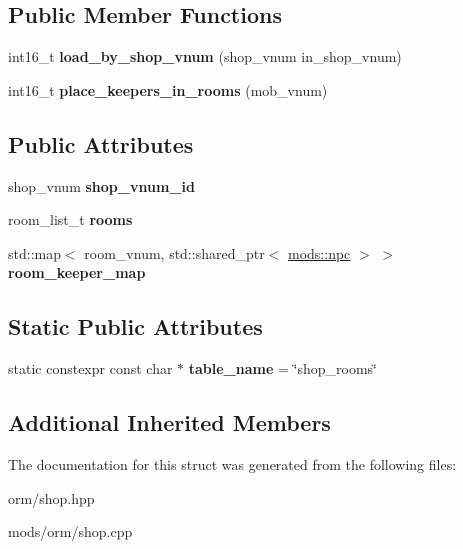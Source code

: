 \subsection*{Public Member Functions}
\begin{DoxyCompactItemize}
\item 
\mbox{\label{structmods_1_1orm_1_1shop__rooms_a9facf0b45b67f151123ca490018e53a3}} 
int16\+\_\+t {\bfseries load\+\_\+by\+\_\+shop\+\_\+vnum} (shop\+\_\+vnum in\+\_\+shop\+\_\+vnum)
\item 
\mbox{\label{structmods_1_1orm_1_1shop__rooms_aaf9b2135573447f06f3a43a8ae4ec7d4}} 
int16\+\_\+t {\bfseries place\+\_\+keepers\+\_\+in\+\_\+rooms} (mob\+\_\+vnum)
\end{DoxyCompactItemize}
\subsection*{Public Attributes}
\begin{DoxyCompactItemize}
\item 
\mbox{\label{structmods_1_1orm_1_1shop__rooms_a814b8d068d4fbe86e3e35895aa3c7051}} 
shop\+\_\+vnum {\bfseries shop\+\_\+vnum\+\_\+id}
\item 
\mbox{\label{structmods_1_1orm_1_1shop__rooms_a289e2ea54a8dd616a3cc7c91a408b79c}} 
room\+\_\+list\+\_\+t {\bfseries rooms}
\item 
\mbox{\label{structmods_1_1orm_1_1shop__rooms_a35b5c0768c0c7b0281f81aca6790b8cb}} 
std\+::map$<$ room\+\_\+vnum, std\+::shared\+\_\+ptr$<$ \hyperlink{structmods_1_1npc}{mods\+::npc} $>$ $>$ {\bfseries room\+\_\+keeper\+\_\+map}
\end{DoxyCompactItemize}
\subsection*{Static Public Attributes}
\begin{DoxyCompactItemize}
\item 
\mbox{\label{structmods_1_1orm_1_1shop__rooms_a227f31310ec4e7de47e61fa6a8214bd0}} 
static constexpr const char $\ast$ {\bfseries table\+\_\+name} = \char`\"{}shop\+\_\+rooms\char`\"{}
\end{DoxyCompactItemize}
\subsection*{Additional Inherited Members}


The documentation for this struct was generated from the following files\+:\begin{DoxyCompactItemize}
\item 
orm/shop.\+hpp\item 
mods/orm/shop.\+cpp\end{DoxyCompactItemize}
